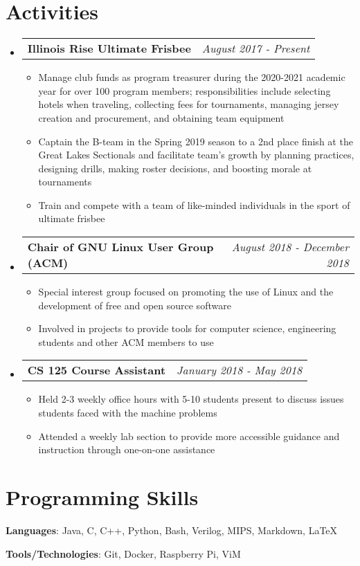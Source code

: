 \documentclass[letterpaper,11pt]{article}
\makeatletter
\newcommand{\resumeBullet}[1]
{\item\small
	{#1 \vspace{-2pt}
	}
}
\newcommand{\resumeSubheading}[2]
{\vspace{-1pt}\item[]
	\begin{tabular*}{0.97\textwidth}{l@{\extracolsep{\fill}}r}
		\textbf{#1} & \textit{\small #2} \\
	\end{tabular*}\vspace{-6pt}
}
\newcommand{\resumeSubHeadingListStart}{\begin{itemize}[leftmargin=*,itemsep=0.2pt]}
\newcommand{\resumeSubHeadingListEnd}{\end{itemize}}
\newcommand{\resumeItemListStart}{\begin{itemize}[itemsep=0.2pt]}
\newcommand{\resumeItemListEnd}{\end{itemize}\vspace{-5pt}}
\makeatother
\begin{document}
\section{Activities}
  \resumeSubHeadingListStart
  \resumeSubheading
  {Illinois Rise Ultimate Frisbee}{August 2017 - Present}
  \resumeItemListStart
  	\resumeBullet
  	{Manage club funds as program treasurer during the 2020-2021 academic year for over 100 program members; responsibilities include selecting hotels when traveling, collecting fees for
tournaments, managing jersey creation and procurement, and obtaining team equipment}
  	\resumeBullet
  	{Captain the B-team in the Spring 2019 season to a 2nd place finish at the Great Lakes Sectionals and facilitate team's growth by planning practices, designing drills, making roster decisions, and boosting morale at tournaments}
  	\resumeBullet
  	{Train and compete with a team of like-minded individuals in the sport of ultimate frisbee}
  \resumeItemListEnd
  	\resumeSubheading
  	{Chair of GNU Linux User Group (ACM)}{August 2018 - December 2018}
  	\resumeItemListStart
  		\resumeBullet
  		{Special interest group focused on promoting the use of Linux and the development of free and open source software}
  		\resumeBullet
  		{Involved in projects to provide tools for computer science, engineering students and other ACM members to use}
  	\resumeItemListEnd
  	\resumeSubheading
  	{CS 125 Course Assistant}{January 2018 - May 2018}
  	\resumeItemListStart
  	\resumeBullet
  	{Held 2-3 weekly office hours with 5-10 students present to discuss issues students faced with the machine problems}
  	\resumeBullet
  	{Attended a weekly lab section to provide more accessible guidance and instruction through one-on-one assistance}
  	\resumeItemListEnd
  \resumeSubHeadingListEnd

\section{Programming Skills}
  \resumeSubHeadingListStart
\begin{multicols}{2}
  	\item[]{
        \textbf{Languages}{: Java, C, C++, Python, Bash, Verilog, MIPS, Markdown, LaTeX}
    }
	\hfill
	\item[]{
      	\textbf{Tools/Technologies}{: Git, Docker, Raspberry Pi, ViM}
    }
\end{multicols}
\resumeSubHeadingListEnd

\end{document}
